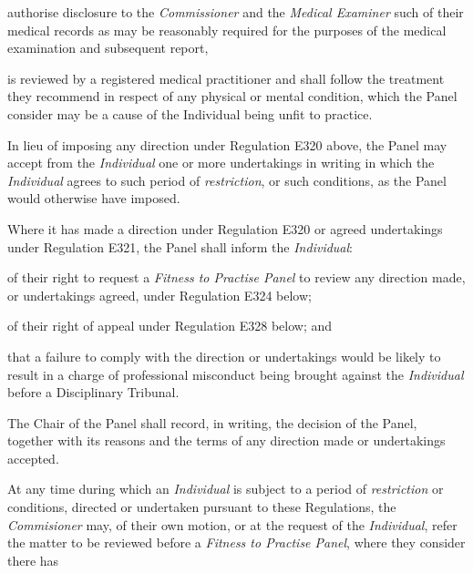 \item  authorise disclosure to the \emph{Commissioner} and the \emph{Medical
Examiner }such of their medical records as may be reasonably required
for the purposes of the medical examination and subsequent report,\\
\item  is reviewed by a registered medical practitioner and shall follow the
treatment they recommend in respect of any physical or mental condition,
which the Panel consider may be a cause of the Individual being unfit to
practice.\la\ln
{}\par
In lieu of imposing any direction under Regulation E320 above, the Panel
may accept from the \emph{Individual} one or more undertakings in
writing in which the \emph{Individual} agrees to such period
of \emph{restriction}, or such conditions, as the Panel would otherwise
have imposed.\\
\par
Where it has made a direction under Regulation E320 or agreed
undertakings under Regulation E321, the Panel shall inform
the \emph{Individual}:\\\nl \item of their right to request a \emph{Fitness to Practise Panel} to
review any direction made, or undertakings agreed, under Regulation E324
below;\item of their right of appeal under Regulation E328 below; and\item that a failure to comply with the direction or undertakings would be
likely to result in a charge of professional misconduct being brought
against the \emph{Individual} before a Disciplinary Tribunal.\ln
{}\par
The Chair of the Panel shall record, in writing, the decision of the
Panel, together with its reasons and the terms of any direction made or
undertakings accepted.\\
\par
{}
At any time during which an \emph{Individual} is subject to a period
of \emph{restriction} or conditions, directed or undertaken pursuant to
these Regulations, the \emph{Commisioner} may, of their own motion, or
at the request of the \emph{Individual}, refer the matter to be reviewed
before a \emph{Fitness to Practise Panel}, where they consider there has
